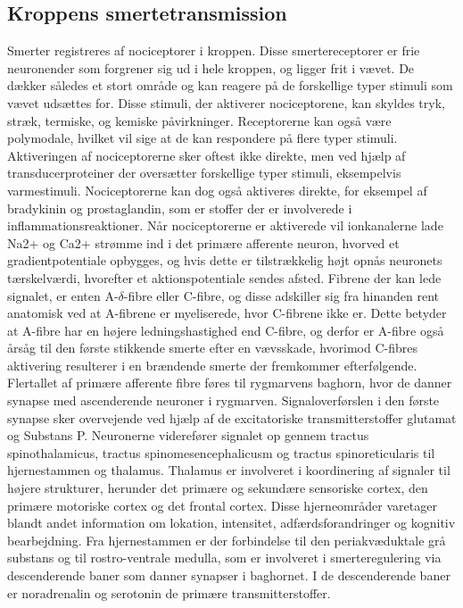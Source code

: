 \subsection{Kroppens smertetransmission}
Smerter registreres af nociceptorer i kroppen. Disse smertereceptorer er frie neuronender som forgrener sig ud i hele kroppen, og ligger frit i vævet. De dækker således et stort område og kan reagere på de forskellige typer stimuli som vævet udsættes for. Disse stimuli, der aktiverer nociceptorene, kan skyldes tryk, stræk, termiske, og kemiske påvirkninger. Receptorerne kan også være polymodale, hvilket vil sige at de kan respondere på flere typer stimuli. Aktiveringen af nociceptorerne sker oftest ikke direkte, men ved hjælp af transducerproteiner der oversætter forskellige typer stimuli, eksempelvis varmestimuli. Nociceptorerne kan dog også aktiveres direkte, for eksempel af bradykinin og prostaglandin, som er stoffer der er involverede i inflammationsreaktioner. Når nociceptorerne er aktiverede vil ionkanalerne lade Na2+ og Ca2+ strømme ind i det primære afferente neuron, hvorved et gradientpotentiale opbygges, og hvis dette er tilstrækkelig højt opnås neuronets tærskelværdi, hvorefter et aktionspotentiale sendes afsted. Fibrene der kan lede signalet, er enten A-$\delta$-fibre eller C-fibre, og disse adskiller sig fra hinanden rent anatomisk ved at A-fibrene er myeliserede, hvor C-fibrene ikke er. Dette betyder at A-fibre har en højere ledningshastighed end C-fibre, og derfor er A-fibre også årsåg til den første stikkende smerte efter en vævsskade, hvorimod C-fibres aktivering resulterer i en brændende smerte der fremkommer efterfølgende. \citep{smerter} 
Flertallet af primære afferente fibre føres til rygmarvens baghorn, hvor de danner synapse med ascenderende neuroner i rygmarven. Signaloverførslen i den første synapse sker overvejende ved hjælp af de excitatoriske transmitterstoffer glutamat og Substans P. 
Neuronerne viderefører signalet op gennem tractus spinothalamicus, tractus spinomesencephalicusm og tractus spinoreticularis til hjernestammen og thalamus. Thalamus er involveret i koordinering af signaler til højere strukturer, herunder det primære og sekundære sensoriske cortex, den primære motoriske cortex og det frontal cortex. Disse hjerneområder varetager blandt andet information om lokation, intensitet, adfærdsforandringer og kognitiv bearbejdning. 
Fra hjernestammen er der forbindelse til den periakvæduktale grå substans og til rostro-ventrale medulla, som er involveret i smerteregulering via descenderende baner som danner synapser i baghornet. I de descenderende baner er noradrenalin og serotonin de primære transmitterstoffer. \citep{smerter}

